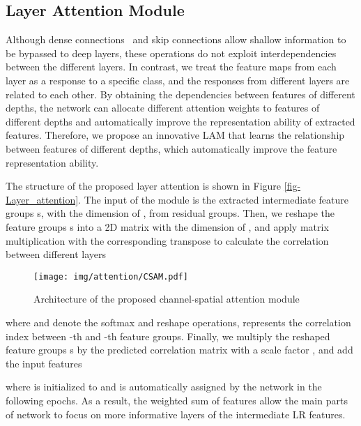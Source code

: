 \documentclass[runningheads]{llncs}
\begin{document}
\subsection{Layer Attention Module}
\label{sec-lam}
Although dense connections~\cite{huang2017densely} and skip connections \cite{he2016deep} allow shallow information to be bypassed to deep layers, 
these operations do not exploit interdependencies between the different layers. 
In contrast, we treat the feature maps from each layer as a response to a specific class, and the responses from different layers are related to each other. 
By obtaining the dependencies between features of different depths, the network can allocate different attention weights to features of different depths and automatically improve the representation ability of extracted features. Therefore, we propose an innovative LAM that learns the relationship between features of different depths, which automatically improve the feature representation ability.


The structure of the proposed layer attention is shown in Figure \ref{fig-Layer_attention}. The input of the module is the extracted intermediate feature groups s, with the dimension of , from  residual groups. 
Then, we reshape the feature groups s into a 2D matrix with the dimension of , and apply matrix multiplication with the corresponding transpose
to calculate the correlation  between different layers

\begin{figure*}[t]\footnotesize
	\begin{center}
		\texttt{[image: img/attention/CSAM.pdf]}
	\end{center}


	\caption{Architecture of the proposed channel-spatial attention module}


	\label{fig-CSAM}
\end{figure*}
where  and  denote the softmax and reshape operations,  represents the correlation index between -th and -th feature groups. 
Finally, we multiply the reshaped feature groups s by the predicted correlation matrix with a scale factor , and add the input features 

where  is initialized to  and is automatically assigned by the network in the following epochs. 
As a result, the weighted sum of features allow the main parts of network to focus on more informative layers of the intermediate LR features.
\end{document}
